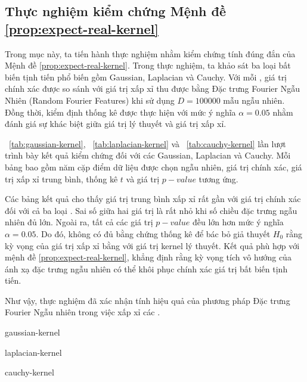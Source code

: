 \subsection{Thực nghiệm kiểm chứng Mệnh đề
\protect\ref{prop:expect-real-kernel}}

Trong mục này, ta tiến hành thực nghiệm nhằm kiểm chứng tính đúng đắn của Mệnh
đề \ref{prop:expect-real-kernel}. Trong thực nghiệm, ta khảo sát ba loại
 bất biến tịnh tiến phổ biến gồm Gaussian, Laplacian và Cauchy. Với
mỗi , giá trị  chính xác được so sánh với giá trị xấp xỉ
thu được bằng Đặc trưng Fourier Ngẫu Nhiên (Random Fourier Features) khi sử dụng
$D=100000$ mẫu ngẫu nhiên. Đồng thời, kiểm định thống kê được thực hiện với
mức ý nghĩa $\alpha=0.05$ nhằm đánh giá sự khác biệt giữa giá trị lý thuyết và
giá trị xấp xỉ.

\tablename~\ref{tab:gaussian-kernel}, \tablename~\ref{tab:laplacian-kernel} và
\tablename~\ref{tab:cauchy-kernel} lần lượt trình bày kết quả kiểm chứng đối
với các  Gaussian, Laplacian và Cauchy. Mỗi bảng bao gồm năm cặp
điểm dữ liệu được chọn ngẫu nhiên, giá trị  chính xác, giá trị xấp
xỉ trung bình, thống kê $t$ và giá trị $p-value$ tương ứng.

Các bảng kết quả cho thấy giá trị trung bình xấp xỉ rất gần với giá trị
 chính xác đối với cả ba loại . Sai số giữa hai giá trị
là rất nhỏ khi số chiều đặc trưng ngẫu nhiên đủ lớn. Ngoài ra, tất cả các giá
trị $p-value$ đều lớn hơn mức ý nghĩa $\alpha = 0.05$. Do đó, không có đủ bằng
chứng thống kê để bác bỏ giả thuyết $H_0$ rằng kỳ vọng của giá trị xấp xỉ bằng
với giá trị kernel lý thuyết. Kết quả phù hợp với mệnh đề
\ref{prop:expect-real-kernel}, khẳng định rằng kỳ vọng tích vô hướng  của ánh
xạ đặc trưng ngẫu nhiên có thể khôi phục chính xác giá trị  bất
biến tịnh tiến.

Như vậy, thực nghiệm đã xác nhận tính hiệu quả của phương pháp Đặc trưng
Fourier Ngẫu nhiên trong việc xấp xỉ các .

\begin{table}[htbp]
  \centering
  \caption{Kết quả kiểm chứng kernel Gaussian}
  \label{tab:gaussian-kernel}
  {gaussian-kernel}
\end{table}

\begin{table}[htbp]
  \centering
  \caption{Kết quả kiểm chứng kernel Laplacian}
  \label{tab:laplacian-kernel}
  {laplacian-kernel}
\end{table}

\begin{table}[htbp]
  \centering
  \caption{Kết quả kiểm chứng kernel Cauchy}
  \label{tab:cauchy-kernel}
  {cauchy-kernel}
\end{table}
